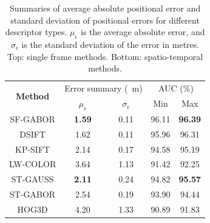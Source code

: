 \begin{table}[!h]
\centering

    \begin{tabular}{ c c c c c }
    \hline
     \multirow{2}{*}{\bf Method}  & \multicolumn{2}{c}{Error summary (\SI{}{m})} & \multicolumn{2}{c}{AUC (\%)}\\ \cline{2-5}    
    & $\mu_{\epsilon}$ & $\sigma_{\epsilon}$ & Min & Max \\ \hline

    SF-GABOR       & \textbf{1.59}             & 0.11             & 96.11   & \textbf{96.39}   \\ \hline
	DSIFT           & 1.62              & 0.11  & 95.96   & 96.31   \\ \hline 

	KP-SIFT           & 2.14              & 0.17  & 94.58   & 95.19   \\ \hline 

	LW-COLOR           & 3.64              & 1.13  & 91.42   & 92.25   \\ \hline \hline


	
	ST-GAUSS        & \textbf{2.11}              & 0.24 & 94.82   & \textbf{95.57}   \\ \hline
    ST-GABOR       & 2.54              & 0.19 & 93.90   & 94.44   \\ \hline

    HOG3D         & 4.20              & 1.33              & 90.89   & 91.83   \\ \hline
    \end{tabular}


\caption{Summaries of average absolute positional error and standard deviation of positional errors for different descriptor types. $\mu_{\epsilon}$ is the average absolute error, and $\sigma_{\epsilon}$ is the standard deviation of the error in metres. Top: single frame methods. Bottom: spatio-temporal methods.}
\label{Table:summaries}
\end{table}

